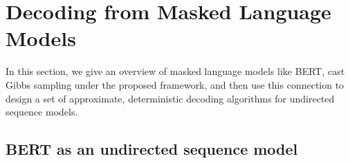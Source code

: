 \documentclass{article}
\begin{document}

\section{Decoding from Masked Language Models}

In this section, we give an overview of masked language models like BERT,
cast Gibbs sampling under the proposed framework,
and then use this connection to design a set of approximate, deterministic decoding algorithms for undirected sequence models.

\subsection{BERT as an undirected sequence model}
\end{document}
